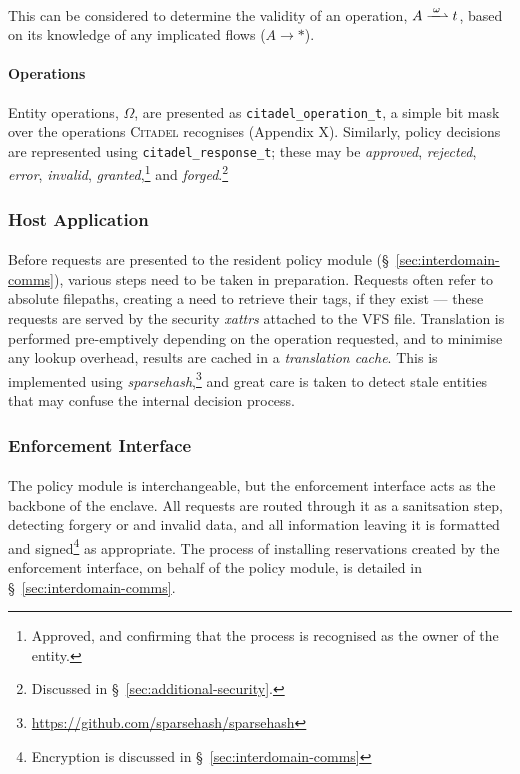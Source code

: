 \paragraph{} This can be considered to determine the validity of an operation, $A \xrightharpoonup{\;\omega\;} t$, based on its knowledge of any implicated flows ($A \rightarrow *$).

\paragraph{Operations} Entity operations, $\Omega$, are presented as \texttt{citadel\_operation\_t}, a simple bit mask over the operations \textsc{Citadel} recognises (Appendix X). Similarly, policy decisions are represented using \texttt{citadel\_response\_t}; these may be \textit{approved}, \textit{rejected}, \textit{error}, \textit{invalid}, \textit{granted},\footnote{Approved, and confirming that the process is recognised as the owner of the entity.} and \textit{forged}.\footnote{Discussed in §~\ref{sec:additional-security}.}


\subsubsection{Host Application}
\paragraph{} Before requests are presented to the resident policy module (§~\ref{sec:interdomain-comms}), various steps need to be taken in preparation. Requests often refer to absolute filepaths, creating a need to retrieve their tags, if they exist --- these requests are served by the security \textit{xattrs} attached to the VFS file. Translation is performed pre-emptively depending on the operation requested, and to minimise any lookup overhead, results are cached in a \textit{translation cache}. This is implemented using \textit{sparsehash},\footnote{\url{https://github.com/sparsehash/sparsehash}} and great care is taken to detect stale entities that may confuse the internal decision process.


\subsubsection{Enforcement Interface}
\paragraph{} The policy module is interchangeable, but the enforcement interface acts as the backbone of the enclave. All requests are routed through it as a sanitsation step, detecting forgery or and invalid data, and all information leaving it is formatted and signed\footnote{Encryption is discussed in §~\ref{sec:interdomain-comms}} as appropriate. The process of installing reservations created by the enforcement interface, on behalf of the policy module, is detailed in §~\ref{sec:interdomain-comms}.

